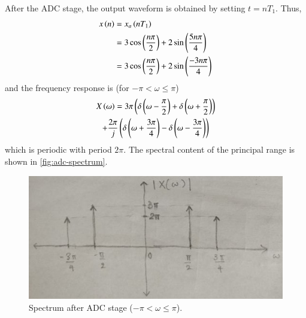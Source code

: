 \documentclass[journal,12pt,twocolumn]{IEEEtran}
\begin{document}
\begin{enumerate}[label=\theenumi.]
    After the ADC stage, the output waveform is obtained by setting
    \(t = nT_1\). Thus,
    \begin{align}
        x\left(n\right) &= x_a\left(nT_1\right) \\
                  &= 3\cos\left(\frac{n\pi}{2}\right) + 2\sin\left(\frac{5n\pi}{4}\right) \\
                  &= 3\cos\left(\frac{n\pi}{2}\right) + 2\sin\left(\frac{-3n\pi}{4}\right)
                  \label{eq:x-adc}
    \end{align}
    and the frequency response is (for \(-\pi < \omega \le \pi\))
    \begin{multline}
        X\left(\omega\right) = 3\pi\left(\delta\left(\omega-\frac{\pi}{2}\right) + \delta\left(\omega+\frac{\pi}{2}\right)\right) \\
        + \frac{2\pi}{j}\left(\delta\left(\omega+\frac{3\pi}{4}\right) - \delta\left(\omega-\frac{3\pi}{4}\right)\right)
        \label{eq:dtft-xn}
    \end{multline}
    which is periodic with period \(2\pi\). The spectral content of the
    principal range is shown in \autoref{fig:adc-spectrum}.
    
    \begin{figure}[!ht]
        \centering
        \includegraphics[width=\columnwidth]{figs/adc-spectrum.jpg}
        \caption{Spectrum after ADC stage (\(-\pi < \omega \le \pi\)).}
        \label{fig:adc-spectrum}
    \end{figure}


\end{enumerate}
\end{document}
